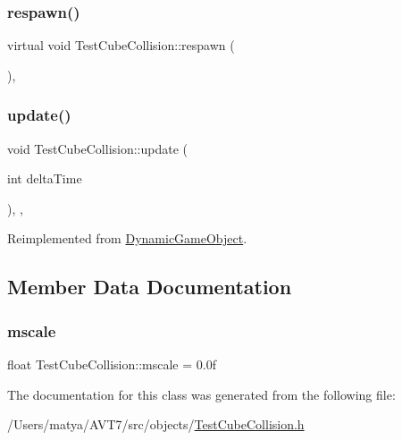 \mbox{\label{class_test_cube_collision_a796cf89af42a38b44956f753e14637b2}} 
\subsubsection{\texorpdfstring{respawn()}{respawn()}}
{\footnotesize\ttfamily virtual void Test\+Cube\+Collision\+::respawn (\begin{DoxyParamCaption}{ }\end{DoxyParamCaption})\hspace{0.3cm}{\ttfamily [inline]}, {\ttfamily [virtual]}}

\mbox{\label{class_test_cube_collision_ae528ac632377372d93964c938748fddf}} 
\subsubsection{\texorpdfstring{update()}{update()}}
{\footnotesize\ttfamily void Test\+Cube\+Collision\+::update (\begin{DoxyParamCaption}\item[{int}]{delta\+Time }\end{DoxyParamCaption})\hspace{0.3cm}{\ttfamily [inline]}, {\ttfamily [final]}, {\ttfamily [virtual]}}



Reimplemented from \hyperlink{class_dynamic_game_object_aaa505b57d131bbbce44d500ec2ca0e83}{Dynamic\+Game\+Object}.



\subsection{Member Data Documentation}
\mbox{\label{class_test_cube_collision_a3cd9b6464419d2c5a26bfc42d120819c}} 
\subsubsection{\texorpdfstring{mscale}{mscale}}
{\footnotesize\ttfamily float Test\+Cube\+Collision\+::mscale = 0.\+0f}



The documentation for this class was generated from the following file\+:\begin{DoxyCompactItemize}
\item 
/\+Users/matya/\+A\+V\+T7/src/objects/\hyperlink{_test_cube_collision_8h}{Test\+Cube\+Collision.\+h}\end{DoxyCompactItemize}
